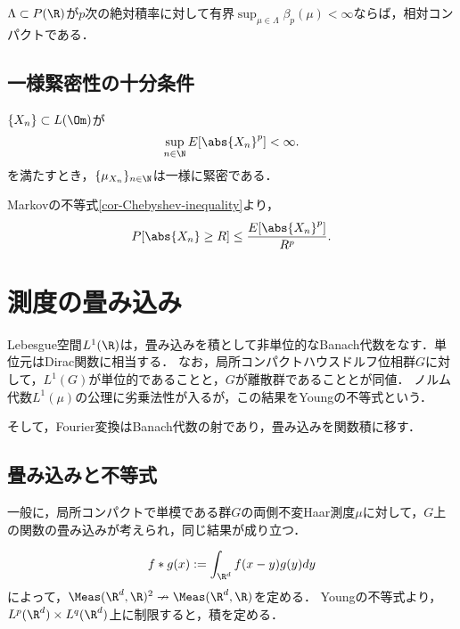 \documentclass[uplatex,dvipdfmx]{jsreport}
\begin{document}
\begin{corollary}
    $\Lambda\subset P(\R)$が$p$次の絶対積率に対して有界$\sup_{\mu\in\Lambda}\beta_p(\mu)<\infty$ならば，相対コンパクトである．
\end{corollary}

\subsection{一様緊密性の十分条件}

\begin{proposition}\label{prop-weak-convergent-measures-are-uniformly-tight}
    $\{X_n\}\subset L(\Om)$が
    \[\sup_{n\in\N}E[\abs{X_n}^p]<\infty.\]
    を満たすとき，$\{\mu_{X_n}\}_{n\in\N}$は一様に緊密である．
\end{proposition}
\begin{Proof}
    Markovの不等式\ref{cor-Chebyshev-inequality}より，
    \[P[\abs{X_n}\ge R]\le\frac{E[\abs{X_n}^p]}{R^p}.\]
\end{Proof}

\section{測度の畳み込み}


\begin{tcolorbox}[colframe=ForestGreen, colback=ForestGreen!10!white,breakable,colbacktitle=ForestGreen!40!white,coltitle=black,fonttitle=\bfseries\sffamily,
    title=]
    Lebesgue空間$L^1(\R)$は，畳み込みを積として非単位的なBanach代数をなす．単位元はDirac関数に相当する．
    なお，局所コンパクトハウスドルフ位相群$G$に対して，$L^1(G)$が単位的であることと，$G$が離散群であることとが同値．
    ノルム代数$L^1(\mu)$の公理に劣乗法性が入るが，この結果をYoungの不等式という．

    そして，Fourier変換はBanach代数の射であり，畳み込みを関数積に移す．
\end{tcolorbox}

\subsection{畳み込みと不等式}

\begin{notation}
    一般に，局所コンパクトで単模である群$G$の両側不変Haar測度$\mu$に対して，$G$上の関数の畳み込みが考えられ，同じ結果が成り立つ．
\end{notation}

\begin{definition}[convolution]
    \[f*g(x):=\int_{\R^d}f(x-y)g(y)dy\]
    によって，$\Meas(\R^d,\R)^2\nrightarrow\Meas(\R^d,\R)$を定める．
    Youngの不等式より，$L^p(\R^d)\times L^q(\R^d)$上に制限すると，積を定める．
\end{definition}
\end{document}
